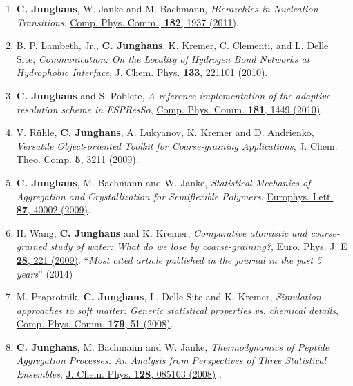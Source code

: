 \documentclass{article}
\begin{document}
\begin{enumerate}
\item[11.] \textbf{C. Junghans}, W. Janke and M. Bachmann,
  \textit{Hierarchies in Nucleation Transitions},
  \href{http://dx.doi.org/10.1016/j.cpc.2010.11.015}{Comp. Phys. Comm., \textbf{182}, 1937 (2011)}.

\item[10.] B. P. Lambeth, Jr., \textbf{C. Junghans}, K. Kremer, C. Clementi, and L. Delle Site, 
  \textit{Communication: On the Locality of Hydrogen Bond Networks at Hydrophobic Interface},
  \href{http://dx.doi.org/10.1063/1.3522773}{J. Chem. Phys. \textbf{133},  221101 (2010)}.

\item[9.] \textbf{C. Junghans} and S. Poblete,
  \textit{A reference implementation of the adaptive resolution scheme in ESPResSo},
  \href{http://dx.doi.org/10.1016/j.cpc.2010.04.013}{Comp. Phys. Comm. \textbf{181}, 1449 (2010)}.

\item[8.] V. R{\"u}hle, \textbf{C. Junghans}, A. Lukyanov, K. Kremer and D. Andrienko,
  \textit{Versatile Object-oriented Toolkit for Coarse-graining Applications},
  \href{http://dx.doi.org/10.1021/ct900369w}{J. Chem. Theo. Comp. \textbf{5}, 3211 (2009)}. 

\item[7.] \textbf{C. Junghans}, M. Bachmann and W. Janke,
  \textit{Statistical Mechanics of Aggregation and Crystallization for Semiflexible Polymers},
  \href{http://dx.doi.org/10.1209/0295-5075/87/40002}{Europhys. Lett. \textbf{87}, 40002 (2009)}.

\item[6.] H. Wang, \textbf{C. Junghans} and K. Kremer,
  \textit{Comparative atomistic and coarse-grained study of water: What do we lose by coarse-graining?},
  \href{http://dx.doi.org/10.1140/epje/i2008-10413-5}{Euro. Phys. J. E \textbf{28}, 221 (2009)}. 
  ``\emph{Most cited article published in the journal in the past 5 years}'' (2014)

\item[5.] M. Praprotnik, \textbf{C. Junghans}, L. Delle Site and K. Kremer,
  \textit{Simulation approaches to soft matter: Generic statistical properties vs. chemical details},
  \href{http://dx.doi.org/10.1016/j.cpc.2008.01.018}{Comp. Phys. Comm. \textbf{179}, 51 (2008)}.

\item[4.] \textbf{C. Junghans}, M. Bachmann and W. Janke,
  \textit{Thermodynamics of Peptide Aggregation Processes: An Analysis from Perspectives of Three Statistical Ensembles},
  \href{http://dx.doi.org/10.1063/1.2830233}{J. Chem. Phys. \textbf{128}, 085103 (2008)} .


\end{enumerate}
\end{document}
